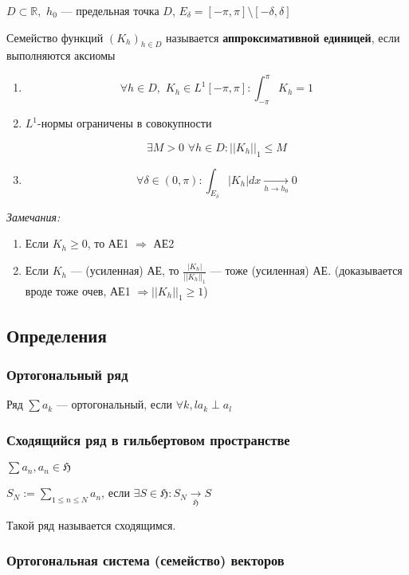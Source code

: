 \documentclass{article}
\def\dbl{\,\,}
\def\goesto#1{\underset{#1}{\longrightarrow}}
\begin{document}
$D \subset \mathbb{R}, \dbl h_0$ --- предельная точка $D$, $E_\delta = [-\pi, \pi] \setminus [-\delta, \delta]$

Семейство функций $(K_h)_{h \in D}$ называется \textbf{аппроксимативной единицей}, если выполняются аксиомы

\begin{enumerate}
    \item \[\forall h \in D, \dbl K_h \in L^1[-\pi, \pi]: \int_{-\pi}^{\pi} K_h = 1\]
    \item $L^1$-нормы ограничены в совокупности
    
    \[\exists M > 0 \dbl \forall h \in D : ||K_h||_1 \le M \]
    \item \[ \forall \delta \in (0, \pi) : \int_{E_{\delta}} |K_h| dx \goesto{h \rightarrow h_0} 0 \]
\end{enumerate}

\textit{Замечания:}

\begin{enumerate}
    \item Если $K_h \ge 0$, то АЕ1 $\Rightarrow$ АЕ2
    \item Если $K_h$ --- (усиленная) АЕ, то $\frac{|K_h|}{||K_h||_1}$ --- тоже (усиленная) АЕ. (доказывается вроде тоже очев, АЕ1 $\Rightarrow ||K_h||_1 \ge 1$)
\end{enumerate}
\newpage
\subsection{Определения}
\subsubsection{Ортогональный ряд}

Ряд $\sum a_k$ --- ортогональный, если $\forall k, l a_k \perp a_l$

\subsubsection{Сходящийся ряд в гильбертовом пространстве}

$\sum a_n, a_n \in \mathfrak{H}$

$S_N := \sum_{1 \le n \le N} a_n$, если $\exists S \in \mathfrak{H}: S_N \goesto{\mathfrak{H}} S$

Такой ряд называется сходящимся.

\subsubsection{Ортогональная система (семейство) векторов}
\end{document}
